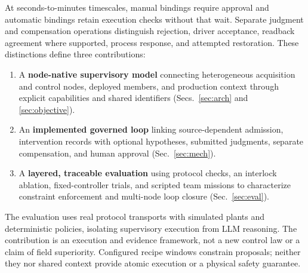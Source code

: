 At seconds-to-minutes timescales, manual bindings require approval and
automatic bindings retain execution checks without that wait. Separate
judgment and compensation operations distinguish rejection, driver acceptance,
readback agreement where supported, process response, and attempted
restoration. These distinctions define three contributions:
\begin{enumerate}
\item A \textbf{node-native supervisory model} connecting heterogeneous
acquisition and control nodes, deployed members, and production context through
explicit capabilities and shared identifiers
(Secs.~\ref{sec:arch} and \ref{sec:objective}).
\item An \textbf{implemented governed loop} linking source-dependent admission,
intervention records with optional hypotheses, submitted judgments, separate
compensation, and human approval (Sec.~\ref{sec:mech}).
\item A \textbf{layered, traceable evaluation} using protocol checks, an
interlock ablation, fixed-controller trials, and scripted team missions to
characterize constraint enforcement and multi-node loop closure
(Sec.~\ref{sec:eval}).
\end{enumerate}
The evaluation uses real protocol transports with simulated plants and
deterministic policies, isolating supervisory execution from LLM reasoning.
The contribution is an execution and evidence framework, not a new control
law or a claim of field superiority. Configured recipe windows constrain
proposals; neither they nor shared context provide atomic execution or a
physical safety guarantee.
